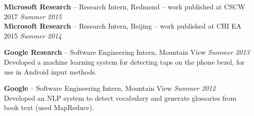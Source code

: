 \documentclass[margin,line]{resume}
\begin{document}
\begin{resume}
\textbf{Microsoft Research} -- Research Intern, Redmond -- work published at CSCW 2017 \hfill \textsl{Summer 2015}\\ %
\textbf{Microsoft Research} -- Research Intern, Beijing -- work published at CHI EA 2015 \hfill \textsl{Summer 2014}\\ %

\vspace{-6.5mm}

\textbf{Google Research} -- Software Engineering Intern, Mountain View \hfill \textsl{Summer 2013}\\
Developed a machine learning system for detecting taps on the phone bezel, for use in Android input methods.\\

\vspace{-6.5mm}

\textbf{Google} -- Software Engineering Intern, Mountain View  \hfill \textsl{Summer 2012}\\
Developed an NLP system to detect vocabulary and generate glossaries from book text (used MapReduce).\\ %


\end{resume}
\end{document}
